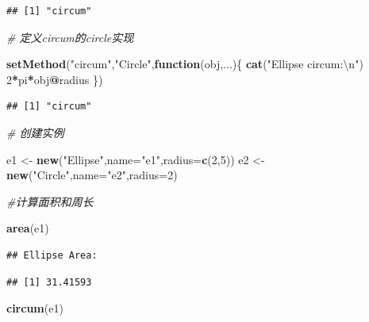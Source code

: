 \documentclass[]{book}
\newenvironment{Shaded}{\begin{snugshade}}{\end{snugshade}}
\newcommand{\KeywordTok}[1]{\textcolor[rgb]{0.13,0.29,0.53}{\textbf{#1}}}
\newcommand{\DataTypeTok}[1]{\textcolor[rgb]{0.13,0.29,0.53}{#1}}
\newcommand{\DecValTok}[1]{\textcolor[rgb]{0.00,0.00,0.81}{#1}}
\newcommand{\CharTok}[1]{\textcolor[rgb]{0.31,0.60,0.02}{#1}}
\newcommand{\StringTok}[1]{\textcolor[rgb]{0.31,0.60,0.02}{#1}}
\newcommand{\CommentTok}[1]{\textcolor[rgb]{0.56,0.35,0.01}{\textit{#1}}}
\newcommand{\ControlFlowTok}[1]{\textcolor[rgb]{0.13,0.29,0.53}{\textbf{#1}}}
\newcommand{\OperatorTok}[1]{\textcolor[rgb]{0.81,0.36,0.00}{\textbf{#1}}}
\newcommand{\NormalTok}[1]{#1}
\begin{document}
\begin{verbatim}
## [1] "circum"
\end{verbatim}

\begin{Shaded}
\begin{Highlighting}[]
\CommentTok{# 定义circum的circle实现}

\KeywordTok{setMethod}\NormalTok{(}\StringTok{"circum"}\NormalTok{,}\StringTok{"Circle"}\NormalTok{,}\ControlFlowTok{function}\NormalTok{(obj,...)\{}
  \KeywordTok{cat}\NormalTok{(}\StringTok{"Ellipse circum:}\CharTok{\textbackslash{}n}\StringTok{"}\NormalTok{)}
  \DecValTok{2}\OperatorTok{*}\NormalTok{pi}\OperatorTok{*}\NormalTok{obj}\OperatorTok{@}\NormalTok{radius}
\NormalTok{\})}
\end{Highlighting}
\end{Shaded}

\begin{verbatim}
## [1] "circum"
\end{verbatim}

\begin{Shaded}
\begin{Highlighting}[]
\CommentTok{# 创建实例}

\NormalTok{e1 <-}\StringTok{ }\KeywordTok{new}\NormalTok{(}\StringTok{"Ellipse"}\NormalTok{,}\DataTypeTok{name=}\StringTok{"e1"}\NormalTok{,}\DataTypeTok{radius=}\KeywordTok{c}\NormalTok{(}\DecValTok{2}\NormalTok{,}\DecValTok{5}\NormalTok{))}
\NormalTok{e2 <-}\StringTok{ }\KeywordTok{new}\NormalTok{(}\StringTok{"Circle"}\NormalTok{,}\DataTypeTok{name=}\StringTok{"e2"}\NormalTok{,}\DataTypeTok{radius=}\DecValTok{2}\NormalTok{)}

\CommentTok{#计算面积和周长}

\KeywordTok{area}\NormalTok{(e1)}
\end{Highlighting}
\end{Shaded}

\begin{verbatim}
## Ellipse Area:
\end{verbatim}

\begin{verbatim}
## [1] 31.41593
\end{verbatim}

\begin{Shaded}
\begin{Highlighting}[]
\KeywordTok{circum}\NormalTok{(e1)}
\end{Highlighting}
\end{Shaded}
\end{document}
